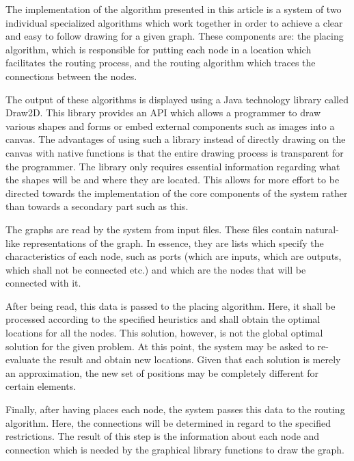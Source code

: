 \label{chap:arch}

The implementation of the algorithm presented in this article is a system of two individual 
specialized algorithms which work together in order to achieve a clear and easy to follow drawing for a given graph.
 These components are: the placing algorithm, which is responsible for putting each node in a location
which facilitates the routing process, and the routing algorithm which traces the
connections between the nodes. 

The output of these algorithms is displayed using a Java technology library called Draw2D.
This library provides an API which allows a programmer to draw various shapes and forms or
embed external components such as images into a canvas. The advantages of using such a 
library instead of directly drawing on the canvas with native functions is that the entire
drawing process is transparent for the programmer. The library only requires essential 
information regarding what the shapes will be and where they are located. This allows for 
more effort to be directed towards the implementation of the core components of the system
rather than towards a secondary part such as this.

The graphs are read by the system from input files. These files contain natural-like
representations of the graph. In essence, they are lists which specify the characteristics
of each node, such as ports (which are inputs, which are outputs, which shall not be 
connected etc.) and which are the nodes that will be connected with it.

After being read, this data is passed to the placing algorithm. Here, it shall be processed 
according to the specified heuristics and shall obtain the optimal locations for all the
nodes. This solution, however, is not the global optimal solution for the given problem. At 
this point, the system may be asked to re-evaluate the result and obtain new locations. Given
that each solution is merely an approximation, the new set of positions may be completely
different for certain elements.

Finally, after having places each node, the system passes this data to the routing algorithm.
Here, the connections will be determined in regard to the specified restrictions. The result of 
this step is the information about each node and connection which is needed by the graphical
library functions to draw the graph.
